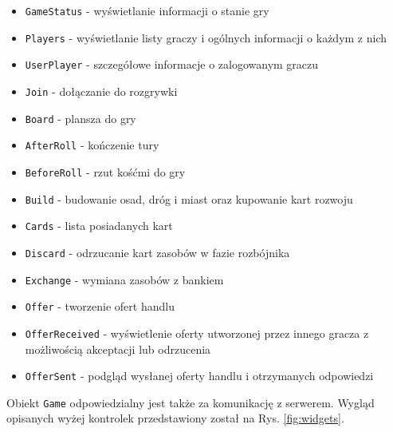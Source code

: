 \documentclass[11pt,twoside]{report}
\providecommand{\imref}[1]{Rys. \ref{#1}} %
\begin{document}
\begin{itemize}
\item \texttt{GameStatus} - wyświetlanie informacji o stanie gry
\item \texttt{Players} - wyświetlanie listy graczy i ogólnych
  informacji o każdym z nich
\item \texttt{UserPlayer} - szczegółowe informacje o zalogowanym graczu
\item \texttt{Join} - dołączanie do rozgrywki
\item \texttt{Board} - plansza do gry
\item \texttt{AfterRoll} - kończenie tury
\item \texttt{BeforeRoll} - rzut kośćmi do gry
\item \texttt{Build} - budowanie osad, dróg i miast oraz kupowanie
  kart rozwoju
\item \texttt{Cards} - lista posiadanych kart
\item \texttt{Discard} - odrzucanie kart zasobów w fazie rozbójnika
\item \texttt{Exchange} - wymiana zasobów z bankiem
\item \texttt{Offer} - tworzenie ofert handlu
\item \texttt{OfferReceived} - wyświetlenie oferty utworzonej przez
  innego gracza z możliwością akceptacji lub odrzucenia
\item \texttt{OfferSent} - podgląd wysłanej oferty handlu i
  otrzymanych odpowiedzi
\end{itemize}

Obiekt \texttt{Game} odpowiedzialny jest także za komunikację z
serwerem. Wygląd opisanych wyżej kontrolek przedstawiony został na
\imref{fig:widgets}.


\end{document}
